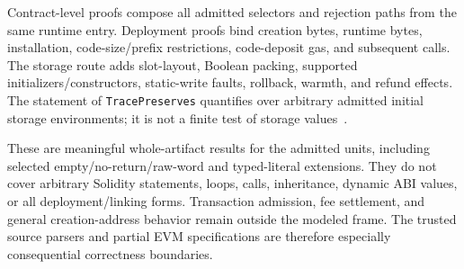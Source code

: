 \documentclass[conference]{IEEEtran}
\begin{document}
Contract-level proofs compose all admitted selectors and rejection paths from
the same runtime entry. Deployment proofs bind creation bytes, runtime bytes,
installation, code-size/prefix restrictions, code-deposit gas, and subsequent
calls. The storage route adds slot-layout, Boolean packing, supported
initializers/constructors, static-write faults, rollback, warmth, and refund
effects. The statement of \texttt{TracePreserves} quantifies over arbitrary
admitted initial storage environments; it is not a finite test of storage
values~\cite{solidity}.

These are meaningful whole-artifact results for the admitted units, including
selected empty/no-return/raw-word and typed-literal extensions. They do not
cover arbitrary Solidity statements, loops, calls, inheritance, dynamic ABI
values, or all deployment/linking forms. Transaction admission, fee settlement,
and general creation-address behavior remain outside the modeled frame.
The trusted source parsers and partial EVM specifications are therefore
especially consequential correctness boundaries.
\end{document}
